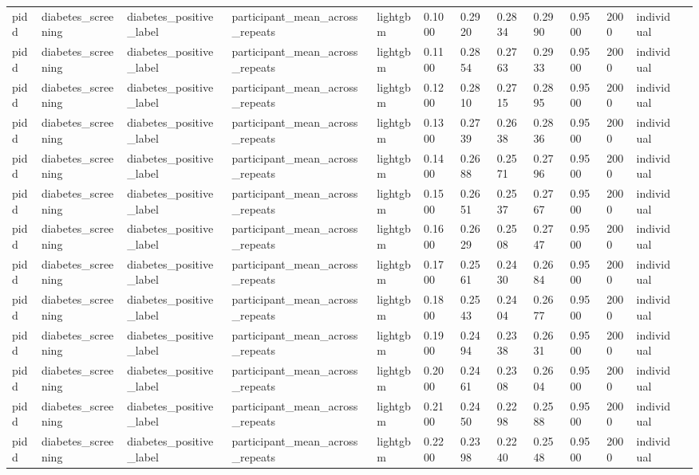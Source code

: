 \begin{tabular}{lllllllllllll}
pidd & diabetes\_screening & diabetes\_positive\_label & participant\_mean\_across\_repeats & lightgbm & 0.1000 & 0.2920 & 0.2834 & 0.2990 & 0.9500 & 2000 & individual &  \\
pidd & diabetes\_screening & diabetes\_positive\_label & participant\_mean\_across\_repeats & lightgbm & 0.1100 & 0.2854 & 0.2763 & 0.2933 & 0.9500 & 2000 & individual &  \\
pidd & diabetes\_screening & diabetes\_positive\_label & participant\_mean\_across\_repeats & lightgbm & 0.1200 & 0.2810 & 0.2715 & 0.2895 & 0.9500 & 2000 & individual &  \\
pidd & diabetes\_screening & diabetes\_positive\_label & participant\_mean\_across\_repeats & lightgbm & 0.1300 & 0.2739 & 0.2638 & 0.2836 & 0.9500 & 2000 & individual &  \\
pidd & diabetes\_screening & diabetes\_positive\_label & participant\_mean\_across\_repeats & lightgbm & 0.1400 & 0.2688 & 0.2571 & 0.2796 & 0.9500 & 2000 & individual &  \\
pidd & diabetes\_screening & diabetes\_positive\_label & participant\_mean\_across\_repeats & lightgbm & 0.1500 & 0.2651 & 0.2537 & 0.2767 & 0.9500 & 2000 & individual &  \\
pidd & diabetes\_screening & diabetes\_positive\_label & participant\_mean\_across\_repeats & lightgbm & 0.1600 & 0.2629 & 0.2508 & 0.2747 & 0.9500 & 2000 & individual &  \\
pidd & diabetes\_screening & diabetes\_positive\_label & participant\_mean\_across\_repeats & lightgbm & 0.1700 & 0.2561 & 0.2430 & 0.2684 & 0.9500 & 2000 & individual &  \\
pidd & diabetes\_screening & diabetes\_positive\_label & participant\_mean\_across\_repeats & lightgbm & 0.1800 & 0.2543 & 0.2404 & 0.2677 & 0.9500 & 2000 & individual &  \\
pidd & diabetes\_screening & diabetes\_positive\_label & participant\_mean\_across\_repeats & lightgbm & 0.1900 & 0.2494 & 0.2338 & 0.2631 & 0.9500 & 2000 & individual &  \\
pidd & diabetes\_screening & diabetes\_positive\_label & participant\_mean\_across\_repeats & lightgbm & 0.2000 & 0.2461 & 0.2308 & 0.2604 & 0.9500 & 2000 & individual &  \\
pidd & diabetes\_screening & diabetes\_positive\_label & participant\_mean\_across\_repeats & lightgbm & 0.2100 & 0.2450 & 0.2298 & 0.2588 & 0.9500 & 2000 & individual &  \\
pidd & diabetes\_screening & diabetes\_positive\_label & participant\_mean\_across\_repeats & lightgbm & 0.2200 & 0.2398 & 0.2240 & 0.2548 & 0.9500 & 2000 & individual &  \\

\end{tabular}
